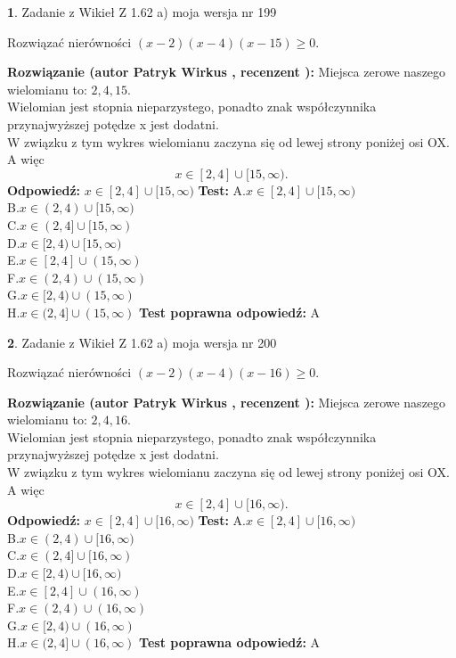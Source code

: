 \documentclass[12pt, a4paper]{article}
\theoremstyle{definition} %
\newtheorem{zad}{}
\newcommand{\zadStart}[1]{\begin{zad}#1\newline}
\newcommand{\zadStop}{\end{zad}}
\newcommand{\rozwStart}[2]{\noindent \textbf{Rozwiązanie (autor #1 , recenzent #2): }\newline}
\newcommand{\rozwStop}{\newline}
\newcommand{\odpStart}{\noindent \textbf{Odpowiedź:}\newline}
\newcommand{\odpStop}{\newline}
\newcommand{\testStart}{\noindent \textbf{Test:}\newline}
\newcommand{\testStop}{\newline}
\newcommand{\kluczStart}{\noindent \textbf{Test poprawna odpowiedź:}\newline}
\newcommand{\kluczStop}{\newline}
\begin{document}
\zadStart{Zadanie z Wikieł Z 1.62 a) moja wersja nr 199}

Rozwiązać nierówności $(x-2)(x-4)(x-15)\ge0$.
\zadStop
\rozwStart{Patryk Wirkus}{}
Miejsca zerowe naszego wielomianu to: $2, 4, 15$.\\
Wielomian jest stopnia nieparzystego, ponadto znak współczynnika przy\linebreak najwyższej potędze x jest dodatni.\\ W związku z tym wykres wielomianu zaczyna się od lewej strony poniżej osi OX. A więc $$x \in [2,4] \cup [15,\infty).$$
\rozwStop
\odpStart
$x \in [2,4] \cup [15,\infty)$
\odpStop
\testStart
A.$x \in [2,4] \cup [15,\infty)$\\
B.$x \in (2,4) \cup [15,\infty)$\\
C.$x \in (2,4] \cup [15,\infty)$\\
D.$x \in [2,4) \cup [15,\infty)$\\
E.$x \in [2,4] \cup (15,\infty)$\\
F.$x \in (2,4) \cup (15,\infty)$\\
G.$x \in [2,4) \cup (15,\infty)$\\
H.$x \in (2,4] \cup (15,\infty)$
\testStop
\kluczStart
A
\kluczStop



\zadStart{Zadanie z Wikieł Z 1.62 a) moja wersja nr 200}

Rozwiązać nierówności $(x-2)(x-4)(x-16)\ge0$.
\zadStop
\rozwStart{Patryk Wirkus}{}
Miejsca zerowe naszego wielomianu to: $2, 4, 16$.\\
Wielomian jest stopnia nieparzystego, ponadto znak współczynnika przy\linebreak najwyższej potędze x jest dodatni.\\ W związku z tym wykres wielomianu zaczyna się od lewej strony poniżej osi OX. A więc $$x \in [2,4] \cup [16,\infty).$$
\rozwStop
\odpStart
$x \in [2,4] \cup [16,\infty)$
\odpStop
\testStart
A.$x \in [2,4] \cup [16,\infty)$\\
B.$x \in (2,4) \cup [16,\infty)$\\
C.$x \in (2,4] \cup [16,\infty)$\\
D.$x \in [2,4) \cup [16,\infty)$\\
E.$x \in [2,4] \cup (16,\infty)$\\
F.$x \in (2,4) \cup (16,\infty)$\\
G.$x \in [2,4) \cup (16,\infty)$\\
H.$x \in (2,4] \cup (16,\infty)$
\testStop
\kluczStart
A
\kluczStop
\end{document}
